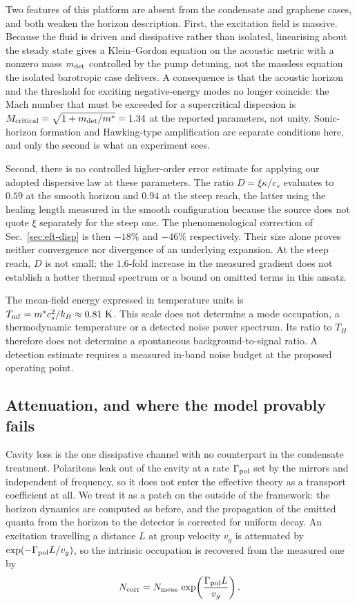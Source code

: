 \documentclass[aps,prd,reprint,nofootinbib,superscriptaddress]{revtex4-2}
\begin{document}
Two features of this platform are absent from the condensate and
graphene cases, and both weaken the horizon description. First, the
excitation field is massive. Because the fluid is driven and dissipative
rather than isolated, linearising about the steady state gives a
Klein--Gordon equation on the acoustic metric with a nonzero mass
$m_{\rm det}$ controlled by the pump detuning, not the massless equation
the isolated barotropic case delivers. A consequence is that the
acoustic horizon and the threshold for exciting negative-energy modes no
longer coincide: the Mach number that must be exceeded for a
supercritical dispersion is
$M_{\rm critical} = \sqrt{1+m_{\rm det}/m^*} = 1.34$ at the reported
parameters, not unity. Sonic-horizon formation and Hawking-type
amplification are separate conditions here, and only the second is what
an experiment sees.

Second, there is no controlled higher-order error estimate for applying
our adopted dispersive law at these parameters. The ratio
$D = \xi\kappa/c_s$ evaluates to $0.59$ at the smooth horizon and
$0.94$ at the steep reach, the latter using the healing length measured
in the smooth configuration because the source does not quote $\xi$
separately for the steep one. The phenomenological correction of
Sec.~\ref{sec:eft-disp} is then $-18\%$ and $-46\%$ respectively.
Their size alone proves neither convergence nor divergence of an
underlying expansion. At the steep reach, $D$ is not small; the
$1.6$-fold increase in the measured gradient does not establish a hotter
thermal spectrum or a bound on omitted terms in this ansatz.

The mean-field energy expressed in temperature units is
$T_{\rm mf}=m^*c_s^2/k_B\approx0.81~\mathrm{K}$.
This scale does not determine a mode occupation, a thermodynamic
temperature or a detected noise power spectrum. Its ratio to $T_H$
therefore does not determine a spontaneous background-to-signal ratio.
A detection estimate requires a measured in-band noise budget at the
proposed operating point.

\subsection{Attenuation, and where the model provably fails}
\label{sec:pol-scope}

Cavity loss is the one dissipative channel with no counterpart in the
condensate treatment. Polaritons leak out of the cavity at a rate
$\Gamma_{\rm pol}$ set by the mirrors and independent of frequency, so
it does not enter the effective theory as a transport coefficient at
all. We treat it as a patch on the outside of the framework: the horizon
dynamics are computed as before, and the propagation of the emitted
quanta from the horizon to the detector is corrected for uniform decay.
An excitation travelling a distance $L$ at group velocity $v_g$ is
attenuated by $\exp(-\Gamma_{\rm pol}L/v_g)$, so the intrinsic
occupation is recovered from the measured one by
\begin{equation}
N_{\rm corr} = N_{\rm meas}\,
\exp\!\left(\frac{\Gamma_{\rm pol}L}{v_g}\right).
\label{eq:pol-atten}
\end{equation}
\end{document}
